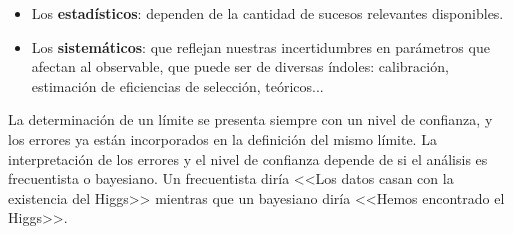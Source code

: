 \begin{itemize}
	\item Los \textbf{estadísticos}: dependen de la cantidad de sucesos relevantes disponibles.
	\item Los \textbf{sistemáticos}: que reflejan nuestras incertidumbres en parámetros que afectan al observable, que puede ser de diversas índoles: calibración, estimación de eficiencias de selección, teóricos...
\end{itemize}
La determinación de un límite se presenta siempre con un nivel de confianza, y los errores ya están incorporados en la definición del mismo límite. La interpretación de los errores y el nivel de confianza depende de si el análisis es frecuentista o bayesiano. Un frecuentista diría <<Los datos casan con la existencia del Higgs>> mientras que un bayesiano diría <<Hemos encontrado el Higgs>>.











